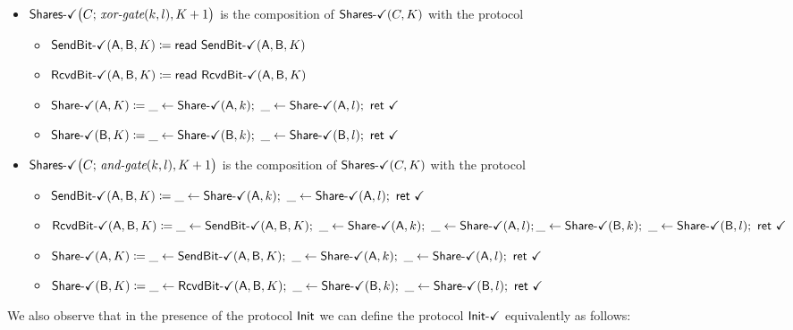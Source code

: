 \begin{itemize}
\item $\SharesOk\big(C; \, \xorgate(k,l),K+1\big)$ is the composition of $\SharesOk(C,K)$ with the protocol
\begin{itemize}
\item {\color{teal} $\SendBitOk(\A,\B,K) \coloneqq \read{\SendBitOk(\A,\B,K)}$}
\item {\color{teal} $\RcvdBitOk(\A,\B,K) \coloneqq \read{\RcvdBitOk(\A,\B,K)}$}
\item {\color{teal} $\ShareOk(\A,K) \coloneqq \_ \leftarrow \ShareOk(\A,k); \ \_ \leftarrow \ShareOk(\A,l); \ \ret{\checkmark}$}
\item {\color{teal} $\ShareOk(\B,K) \coloneqq \_ \leftarrow \ShareOk(\B,k); \ \_ \leftarrow \ShareOk(\B,l); \ \ret{\checkmark}$}
\end{itemize}

\item $\SharesOk\big(C; \, \andgate(k,l),K+1\big)$ is the composition of $\SharesOk(C,K)$ with the protocol
\begin{itemize}
\item {\color{teal} $\SendBitOk(\A,\B,K) \coloneqq \_ \leftarrow \ShareOk(\A,k); \ \_ \leftarrow \ShareOk(\A,l); \ \ret{\checkmark}$}
\item {\color{teal} $\RcvdBitOk(\A,\B,K) \coloneqq \_ \leftarrow \SendBitOk(\A,\B,K); \ \_ \leftarrow \ShareOk(\A,k); \ \_ \leftarrow \ShareOk(\A,l); \\ \_ \leftarrow \ShareOk(\B,k); \ \_ \leftarrow \ShareOk(\B,l); \ \ret{\checkmark}$}
\item {\color{teal} $\ShareOk(\A,K) \coloneqq \_ \leftarrow \SendBitOk(\A,\B,K); \ \_ \leftarrow \ShareOk(\A,k); \ \_ \leftarrow \ShareOk(\A,l); \ \ret{\checkmark}$}
\item {\color{teal} $\ShareOk(\B,K) \coloneqq \_ \leftarrow \RcvdBitOk(\A,\B,K); \ \_ \leftarrow \ShareOk(\B,k); \ \_ \leftarrow \ShareOk(\B,l); \ \ret{\checkmark}$}
\end{itemize}
\end{itemize}

\noindent We also observe that in the presence of the protocol $\Init$ we can define the protocol $\InitOk$ equivalently as follows:

